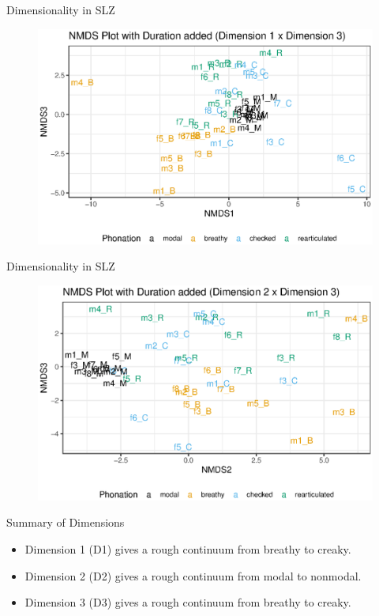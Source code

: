 \documentclass{beamer}
\begin{document}
\begin{frame}{Dimensionality in SLZ}
  \begin{figure}
    \centering
    \includegraphics[width = 0.8\linewidth]{images/MDS/nmds13_dur.eps}
  \end{figure}
\end{frame}

\begin{frame}{Dimensionality in SLZ}
  \begin{figure}
    \centering
    \includegraphics[width = 0.8\linewidth]{images/MDS/nmds23_dur.eps}
  \end{figure}
\end{frame}

\begin{frame}{Summary of Dimensions}
  \begin{itemize}
    \item Dimension 1 (D1) gives a rough continuum from breathy to creaky.
    \item Dimension 2 (D2) gives a rough continuum from modal to nonmodal.
    \item Dimension 3 (D3) gives a rough continuum from breathy to creaky.
  \end{itemize}
\end{frame}
\end{document}
